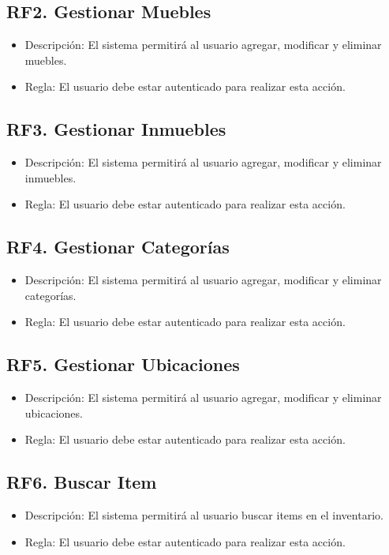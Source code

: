 \documentclass{article}
\begin{document}
\subsection{RF2. Gestionar Muebles}
\begin{itemize}
    \item Descripción: El sistema permitirá al usuario agregar, modificar y eliminar muebles.
    \item Regla: El usuario debe estar autenticado para realizar esta acción.
\end{itemize}

\subsection{RF3. Gestionar Inmuebles}
\begin{itemize}
    \item Descripción: El sistema permitirá al usuario agregar, modificar y eliminar inmuebles.
    \item Regla: El usuario debe estar autenticado para realizar esta acción.
\end{itemize}

\subsection{RF4. Gestionar Categorías}
\begin{itemize}
    \item Descripción: El sistema permitirá al usuario agregar, modificar y eliminar categorías.
    \item Regla: El usuario debe estar autenticado para realizar esta acción.
\end{itemize}

\subsection{RF5. Gestionar Ubicaciones}
\begin{itemize}
    \item Descripción: El sistema permitirá al usuario agregar, modificar y eliminar ubicaciones.
    \item Regla: El usuario debe estar autenticado para realizar esta acción.
\end{itemize}

\subsection{RF6. Buscar Item}
\begin{itemize}
    \item Descripción: El sistema permitirá al usuario buscar items en el inventario.
    \item Regla: El usuario debe estar autenticado para realizar esta acción.
\end{itemize}
\end{document}
